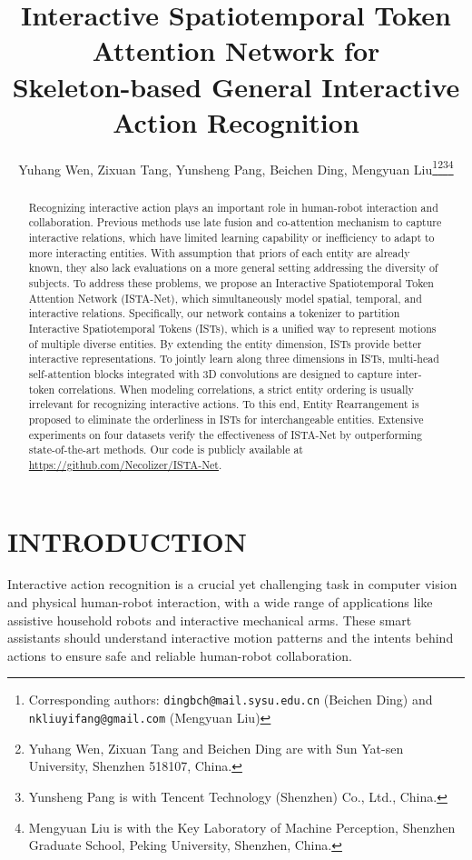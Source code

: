 \documentclass[letterpaper, 10 pt, conference]{ieeeconf}
\title{\LARGE \bf
Interactive Spatiotemporal Token Attention Network for \protect\\ Skeleton-based General Interactive Action Recognition
}
\author{Yuhang Wen, Zixuan Tang, Yunsheng Pang, Beichen Ding, Mengyuan Liu\thanks{Corresponding authors: {\tt\small dingbch@mail.sysu.edu.cn} (Beichen Ding) and {\tt\small nkliuyifang@gmail.com} (Mengyuan Liu)}\thanks{Yuhang Wen, Zixuan Tang and Beichen Ding are with Sun Yat-sen University, Shenzhen 518107, China.}\thanks{Yunsheng Pang is with Tencent Technology (Shenzhen) Co., Ltd., China.}\thanks{Mengyuan Liu is with the Key Laboratory of Machine Perception, Shenzhen Graduate School, Peking University, Shenzhen, China.}}
\begin{document}
\maketitle
\thispagestyle{empty}
\pagestyle{empty}


\begin{abstract}
Recognizing interactive action plays an important role in human-robot interaction and collaboration. Previous methods use late fusion and co-attention mechanism to capture interactive relations, which have limited learning capability or inefficiency to adapt to more interacting entities. With assumption that priors of each entity are already known, they also lack evaluations on a more general setting addressing the diversity of subjects. To address these problems, we propose an Interactive Spatiotemporal Token Attention Network (ISTA-Net), which simultaneously model spatial, temporal, and interactive relations. Specifically, our network contains a tokenizer to partition Interactive Spatiotemporal Tokens (ISTs), which is a unified way to represent motions of multiple diverse entities. By extending the entity dimension, ISTs provide better interactive representations. To jointly learn along three dimensions in ISTs, multi-head self-attention blocks integrated with 3D convolutions are designed to capture inter-token correlations. When modeling correlations, a strict entity ordering is usually irrelevant for recognizing interactive actions. To this end, Entity Rearrangement is proposed to eliminate the orderliness in ISTs for interchangeable entities. Extensive experiments on four datasets verify the effectiveness of ISTA-Net by outperforming state-of-the-art methods. Our code is publicly available at \url{https://github.com/Necolizer/ISTA-Net}.
\end{abstract}


\section{INTRODUCTION}

Interactive action recognition is a crucial yet challenging task in computer vision and physical human-robot interaction\cite{9636389,9636110,zheng2017image,DBLP:conf/iros/XingB22}, with a wide range of applications like assistive household robots\cite{9636381} and interactive mechanical arms\cite{7554295}. These smart assistants should understand interactive motion patterns and the intents behind actions to ensure safe and reliable human-robot collaboration\cite{9636107,9636553}.
\end{document}

